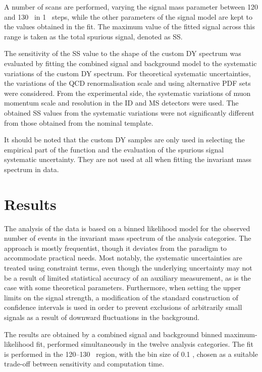 A number of scans are performed, varying the signal mass parameter
between 120 and 130 \GeV~in 1 \GeV~steps, while the other parameters
of the signal model are kept to the values obtained in the fit.
The maximum value of the fitted signal across this range is taken
as the total spurious signal, denoted as SS.

The sensitivity of the SS value to the shape of the custom DY
spectrum was evaluated by fitting the combined signal and
background model to the systematic variations of the custom DY
spectrum. For theoretical systematic uncertainties, the variations
of the QCD renormalisation scale and using alternative PDF sets
were considered. From the experimental side, the systematic
variations of muon momentum scale and resolution in the ID and
MS detectors were used. The obtained SS values from the
systematic variations were not significantly different from
those obtained from the nominal template.

It should be noted that the custom DY samples are only used in
selecting the empirical part of the function and the evaluation
of the spurious signal systematic uncertainty. They are not used
at all when fitting the invariant mass spectrum in data.

\section{Results}

The analysis of the data is based on a binned likelihood model
for the observed number of events in the invariant mass spectrum
of the analysis categories. The approach is mostly frequentist,
though it deviates from the paradigm to accommodate practical needs.
Most notably, the systematic uncertainties are treated using
constraint terms, even though the underlying uncertainty may not
be a result of limited statistical accuracy of an auxiliary
measurement, as is the case with some theoretical parameters.
Furthermore, when setting the upper limits on the signal
strength, a modification of the standard construction of
confidence intervals is used in order to prevent exclusions of
arbitrarily small signals as a result of downward fluctuations
in the background.

The results are obtained by a combined signal and background
binned maximum-likelihood fit, performed simultaneously in the
twelve analysis categories. The fit is performed in the 120--130
\GeV~region, with the bin size of 0.1 \GeV, chosen as a suitable trade-off
between sensitivity and computation time.

